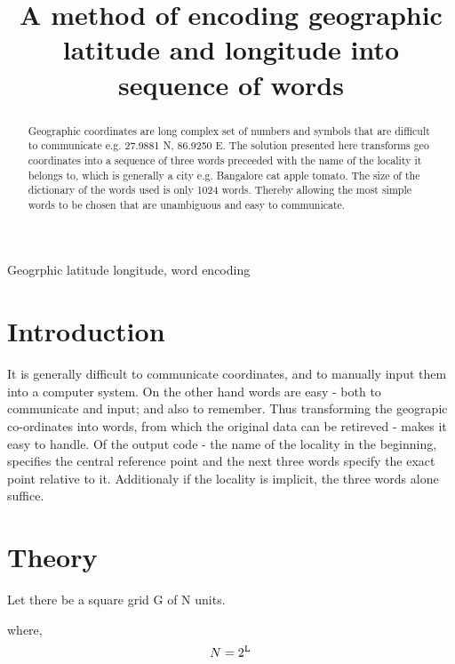 \documentclass[conference]{IEEEtran}
\begin{document}
\title{A method of encoding geographic latitude and longitude into sequence of words}

\author{
}

\maketitle

\begin{abstract}
Geographic coordinates are long complex set of numbers and symbols that are difficult to communicate e.g. 27.9881 N, 86.9250 E. The solution presented here transforms geo coordinates into a sequence of three words preceeded with the name of the locality it belongs to, which is generally a city e.g. Bangalore cat apple tomato. The size of the dictionary of the words used is only 1024 words. Thereby allowing the most simple words to be chosen that are unambiguous and easy to communicate.
\end{abstract}

\begin{IEEEkeywords}
Geogrphic latitude longitude, word encoding
\end{IEEEkeywords}

\section{Introduction}
It is generally difficult to communicate coordinates, and to manually input them into a computer system. On the other hand words are easy - both to communicate and input; and also to remember. Thus transforming the geograpic co-ordinates into words, from which the original data can be retireved - makes it easy to handle. Of the output code - the name of the locality in the beginning, specifies the central reference point and the next three words specify the exact point relative to it. Additionaly if the locality is implicit, the three words alone suffice.
\section{Theory}
Let there be a square grid G of N units.

where, \begin{equation}N = 2\textsuperscript{L} \end{equation}
\end{document}
